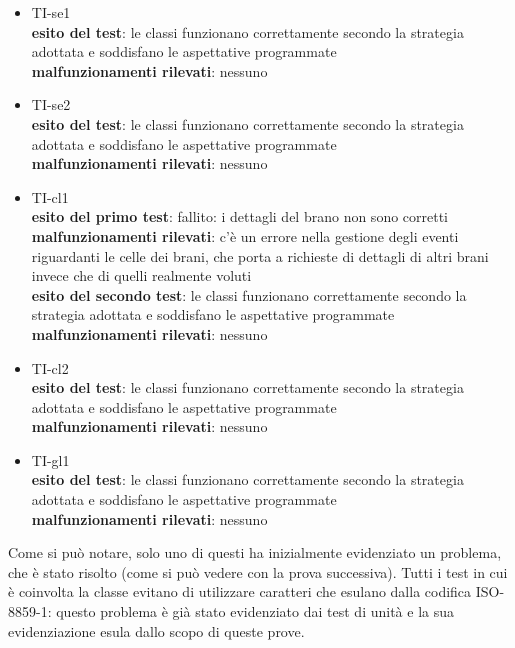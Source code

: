 \begin{itemize}
  \item TI-se1\\
  \textbf{esito del test}: le classi funzionano correttamente secondo la
  strategia adottata e soddisfano le aspettative programmate\\
  \textbf{malfunzionamenti rilevati}: nessuno\\
  
  \item TI-se2\\
  \textbf{esito del test}: le classi funzionano correttamente secondo la
  strategia adottata e soddisfano le aspettative programmate\\
  \textbf{malfunzionamenti rilevati}: nessuno\\
  
  \item TI-cl1\\
  \textbf{esito del primo test}: fallito: i dettagli del brano non sono
  corretti\\ 
  \textbf{malfunzionamenti rilevati}: c'\`e un errore nella gestione degli
  eventi riguardanti le celle dei brani, che porta a richieste di dettagli di
  altri brani invece che di quelli realmente voluti\\
  \textbf{esito del secondo test}: le classi funzionano correttamente secondo la
  strategia adottata e soddisfano le aspettative programmate\\
  \textbf{malfunzionamenti rilevati}: nessuno\\
  
  \item TI-cl2\\
  \textbf{esito del test}: le classi funzionano correttamente secondo la
  strategia adottata e soddisfano le aspettative programmate\\
  \textbf{malfunzionamenti rilevati}: nessuno\\
  
  \item TI-gl1\\
  \textbf{esito del test}: le classi funzionano correttamente secondo la
  strategia adottata e soddisfano le aspettative programmate\\
  \textbf{malfunzionamenti rilevati}: nessuno\\
\end{itemize}
Come si pu\`o notare, solo uno di questi ha inizialmente evidenziato un
problema, che \`e stato risolto (come si pu\`o vedere con la prova successiva).
Tutti i test in cui \`e coinvolta la classe  evitano di
utilizzare caratteri che esulano dalla codifica ISO-8859-1: questo problema \`e
gi\`a stato evidenziato dai test di unit\`a e la sua evidenziazione esula dallo
scopo di queste prove.


